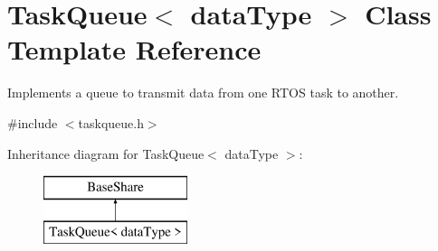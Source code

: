 \hypertarget{class_task_queue}{}\section{Task\+Queue$<$ data\+Type $>$ Class Template Reference}
\label{class_task_queue}


Implements a queue to transmit data from one R\+T\+OS task to another.  




{\ttfamily \#include $<$taskqueue.\+h$>$}

Inheritance diagram for Task\+Queue$<$ data\+Type $>$\+:\begin{figure}[H]
\begin{center}
\leavevmode
\includegraphics[height=2.000000cm]{class_task_queue}
\end{center}
\end{figure}
